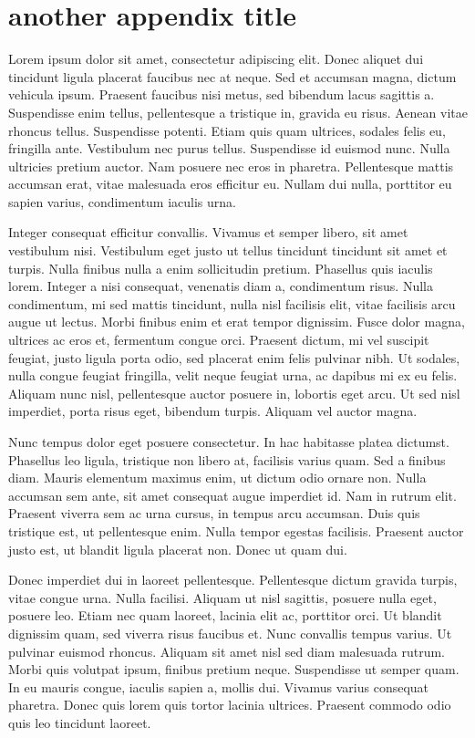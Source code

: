 \chapter{another appendix title}

Lorem ipsum dolor sit amet, consectetur adipiscing elit. Donec aliquet dui tincidunt ligula placerat faucibus nec at neque. Sed et accumsan magna, dictum vehicula ipsum. Praesent faucibus nisi metus, sed bibendum lacus sagittis a. Suspendisse enim tellus, pellentesque a tristique in, gravida eu risus. Aenean vitae rhoncus tellus. Suspendisse potenti. Etiam quis quam ultrices, sodales felis eu, fringilla ante. Vestibulum nec purus tellus. Suspendisse id euismod nunc. Nulla ultricies pretium auctor. Nam posuere nec eros in pharetra. Pellentesque mattis accumsan erat, vitae malesuada eros efficitur eu. Nullam dui nulla, porttitor eu sapien varius, condimentum iaculis urna.

Integer consequat efficitur convallis. Vivamus et semper libero, sit amet vestibulum nisi. Vestibulum eget justo ut tellus tincidunt tincidunt sit amet et turpis. Nulla finibus nulla a enim sollicitudin pretium. Phasellus quis iaculis lorem. Integer a nisi consequat, venenatis diam a, condimentum risus. Nulla condimentum, mi sed mattis tincidunt, nulla nisl facilisis elit, vitae facilisis arcu augue ut lectus. Morbi finibus enim et erat tempor dignissim. Fusce dolor magna, ultrices ac eros et, fermentum congue orci. Praesent dictum, mi vel suscipit feugiat, justo ligula porta odio, sed placerat enim felis pulvinar nibh. Ut sodales, nulla congue feugiat fringilla, velit neque feugiat urna, ac dapibus mi ex eu felis. Aliquam nunc nisl, pellentesque auctor posuere in, lobortis eget arcu. Ut sed nisl imperdiet, porta risus eget, bibendum turpis. Aliquam vel auctor magna.

Nunc tempus dolor eget posuere consectetur. In hac habitasse platea dictumst. Phasellus leo ligula, tristique non libero at, facilisis varius quam. Sed a finibus diam. Mauris elementum maximus enim, ut dictum odio ornare non. Nulla accumsan sem ante, sit amet consequat augue imperdiet id. Nam in rutrum elit. Praesent viverra sem ac urna cursus, in tempus arcu accumsan. Duis quis tristique est, ut pellentesque enim. Nulla tempor egestas facilisis. Praesent auctor justo est, ut blandit ligula placerat non. Donec ut quam dui.

Donec imperdiet dui in laoreet pellentesque. Pellentesque dictum gravida turpis, vitae congue urna. Nulla facilisi. Aliquam ut nisl sagittis, posuere nulla eget, posuere leo. Etiam nec quam laoreet, lacinia elit ac, porttitor orci. Ut blandit dignissim quam, sed viverra risus faucibus et. Nunc convallis tempus varius. Ut pulvinar euismod rhoncus. Aliquam sit amet nisl sed diam malesuada rutrum. Morbi quis volutpat ipsum, finibus pretium neque. Suspendisse ut semper quam. In eu mauris congue, iaculis sapien a, mollis dui. Vivamus varius consequat pharetra. Donec quis lorem quis tortor lacinia ultrices. Praesent commodo odio quis leo tincidunt laoreet.

